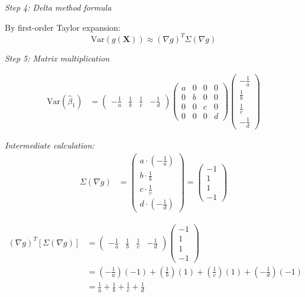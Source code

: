 \documentclass[12pt]{article}
\begin{document}
\begin{solution}
\textit{Step 4: Delta method formula}

By first-order Taylor expansion:
\[
\text{Var}(g(\mathbf{X})) \approx (\nabla g)^T \Sigma (\nabla g)
\]

\textit{Step 5: Matrix multiplication}

\begin{align*}
\text{Var}(\hat{\beta}_1) &= \begin{pmatrix}
-\frac{1}{a} & \frac{1}{b} & \frac{1}{c} & -\frac{1}{d}
\end{pmatrix}
\begin{pmatrix}
a & 0 & 0 & 0 \\
0 & b & 0 & 0 \\
0 & 0 & c & 0 \\
0 & 0 & 0 & d
\end{pmatrix}
\begin{pmatrix}
-\frac{1}{a} \\
\frac{1}{b} \\
\frac{1}{c} \\
-\frac{1}{d}
\end{pmatrix}
\end{align*}

\textit{Intermediate calculation:}
\begin{align*}
\Sigma (\nabla g) &= \begin{pmatrix}
a \cdot (-\frac{1}{a}) \\
b \cdot \frac{1}{b} \\
c \cdot \frac{1}{c} \\
d \cdot (-\frac{1}{d})
\end{pmatrix} = \begin{pmatrix}
-1 \\
1 \\
1 \\
-1
\end{pmatrix}
\end{align*}

\begin{align*}
(\nabla g)^T [\Sigma (\nabla g)] &= \begin{pmatrix}
-\frac{1}{a} & \frac{1}{b} & \frac{1}{c} & -\frac{1}{d}
\end{pmatrix}
\begin{pmatrix}
-1 \\
1 \\
1 \\
-1
\end{pmatrix} \\
&= (-\frac{1}{a})(-1) + (\frac{1}{b})(1) + (\frac{1}{c})(1) + (-\frac{1}{d})(-1) \\
&= \frac{1}{a} + \frac{1}{b} + \frac{1}{c} + \frac{1}{d}
\end{align*}


\end{solution}
\end{document}
